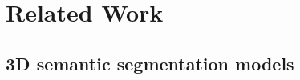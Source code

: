 \documentclass[journal]{IEEEtran}
\begin{document}


\section{Related Work} \label{sec:2}


\subsection{3D semantic segmentation models}
\end{document}
